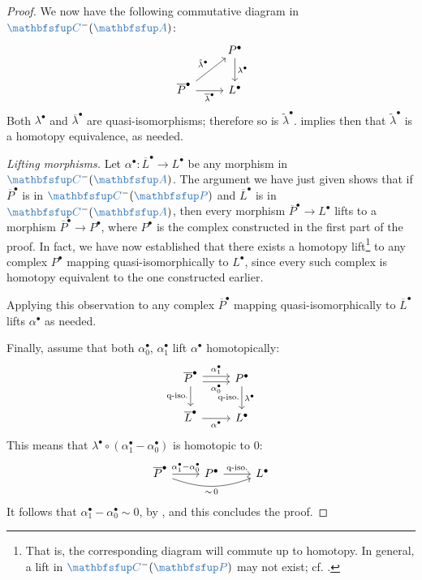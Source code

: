 \begin{proof}
  We now have the following commutative diagram in
  $\categ{C}^-(\categ{A})$:
  \[\begin{tikzcd}
      & P^\bullet \arrow[d, "\lambda^\bullet"] \\
      \overline P^\bullet \arrow[ur, "\tilde\lambda^\bullet"]
      \arrow[r, "\overline\lambda^\bullet"'] & L^\bullet
    \end{tikzcd}\] Both $\lambda^\bullet$ and
  $\overline\lambda^\bullet$ are quasi-isomorphisms; therefore so is
  $\tilde\lambda^\bullet$.   implies then
  that $\tilde\lambda^\bullet$ is a homotopy equivalence, as needed.

  \emph{Lifting morphisms.} Let
  $\alpha^\bullet : \overline L^\bullet \to L^\bullet$ be any morphism
  in $\categ{C}^-(\categ{A})$. The argument we have just given shows
  that if $\overline P^\bullet$ is in $\categ{C}^-(\categ{P})$ and
  $\overline L^\bullet$ is in $\categ{C}^-(\categ{A})$, then every
  morphism $\overline P^\bullet \to L^\bullet$ lifts to a morphism
  $\overline P^\bullet \to P^\bullet$, where $P^\bullet$ is the
  complex constructed in the first part of the proof. In fact, we have
  now established that there exists a homotopy lift\footnote{That is,
    the corresponding diagram will commute up to homotopy. In general,
    a lift in $\categ{C}^-(\categ{P})$ may not exist;
    cf. .}
  to any complex $P^\bullet$ mapping quasi-isomorphically to
  $L^\bullet$, since every such complex is homotopy equivalent to the
  one constructed earlier.

  Applying this observation to any complex $\overline P^\bullet$
  mapping quasi-isomorphically to $\overline L^\bullet$ lifts
  $\alpha^\bullet$ as needed.

  Finally, assume that both $\alpha_0^\bullet$, $\alpha_1^\bullet$
  lift $\alpha^\bullet$ homotopically:
  \[\begin{tikzcd}
      \overline P^\bullet \arrow[r, "\alpha_1^\bullet", shift left]
      \arrow[r, "\alpha_0^\bullet"', shift right] \arrow[d,
      "\text{q-iso.}"'] &
      P^\bullet \arrow[d, "\lambda^\bullet", "\text{q-iso.}"'] \\
      \overline L^\bullet \arrow[r, "\alpha^\bullet"'] & L^\bullet
    \end{tikzcd}\] This means that
  $\lambda^\bullet \circ (\alpha_1^\bullet - \alpha_0^\bullet)$ is
  homotopic to $0$:
  \[\begin{tikzcd}
      \overline P^\bullet \arrow[r, "\alpha_1^\bullet -
      \alpha_0^\bullet"] \arrow[rr, "\sim\, 0"', bend right=20] &
      P^\bullet \arrow[r, "\text{q-iso.}"] & L^\bullet
    \end{tikzcd}\] It follows that
  $\alpha_1^\bullet - \alpha_0^\bullet \sim 0$, by
  , and this concludes the proof.
\end{proof}

